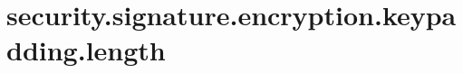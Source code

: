 \section{security.signature.encryption.keypadding.length}
\label{configuration:SecuritySignatureEncryptionKeypaddingLength}
\TODO
